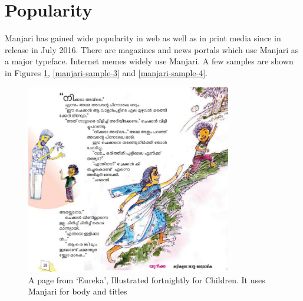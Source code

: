 \documentclass[11pt,twoside,a4paper,parskip=half]{scrartcl}
\begin{document}
\section{Popularity}

Manjari has gained wide popularity in web as well as in print media since in release in July 2016. There are magazines and news portals which use Manjari as a major typeface. Internet memes widely use Manjari. A few samples are shown in Figures \ref{manjari-sample-1}, \ref{manjari-sample-3} and \ref{manjari-sample-4}. 

\begin{figure}[h!]
	\includegraphics[width=0.8\textwidth]{images/manjari-sample-1.png}
	\caption{A page from `Eureka', Illustrated fortnightly for Children. It uses Manjari for body and titles}
	\label{manjari-sample-1}
\end{figure}
\end{document}

